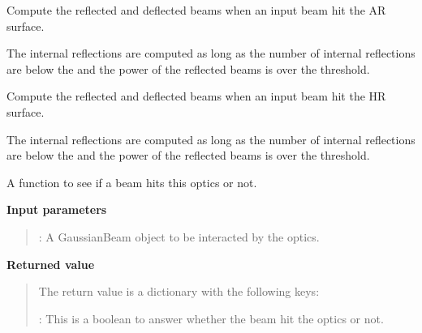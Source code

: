 \documentclass[letterpaper,10pt,english]{sphinxmanual}
\begin{document}
\begin{fulllineitems}
\begin{fulllineitems}
\end{fulllineitems}


\begin{fulllineitems}
\label{api/gtrace:gtrace.optcomp.Mirror.hitFromAR}
Compute the reflected and deflected beams when
an input beam hit the AR surface.

The internal reflections are computed as long as the number
of internal reflections are below the  and the power
of the reflected beams is over the threshold.

\end{fulllineitems}


\begin{fulllineitems}
\label{api/gtrace:gtrace.optcomp.Mirror.hitFromHR}
Compute the reflected and deflected beams when
an input beam hit the HR surface.

The internal reflections are computed as long as the number
of internal reflections are below the  and the power
of the reflected beams is over the threshold.

\end{fulllineitems}


\begin{fulllineitems}
\label{api/gtrace:gtrace.optcomp.Mirror.isHit}
A function to see if a beam hits this optics or not.

\textbf{Input parameters}
\begin{quote}

:
A GaussianBeam object to be interacted by the optics.
\end{quote}

\textbf{Returned value}
\begin{quote}

The return value is a dictionary with the following keys:

:
This is a boolean to answer whether the beam hit the optics
or not.


\end{quote}
\end{fulllineitems}
\end{fulllineitems}
\end{document}
